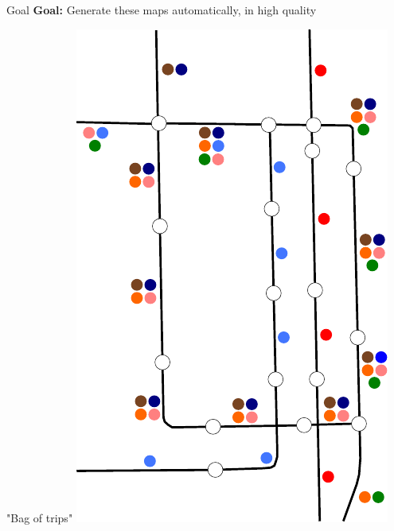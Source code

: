 \documentclass{beamer}
\begin{document}
\begin{frame}{Goal}
	\textbf{Goal:} Generate these maps \alert{automatically}, in \alert{high quality}

	"Bag of trips"
	\pause
	\includegraphics[width=0.25\paperwidth]{figures/chicago_linegraph.pdf}
	\pause

\end{frame}
\end{document}
